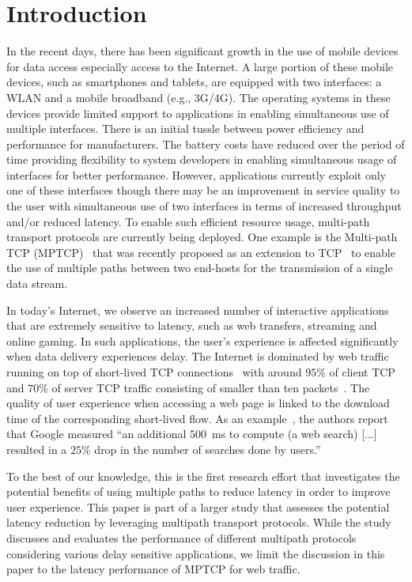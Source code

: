 \section{Introduction}
\label{sec:introduction}
In the recent days, there has been significant growth in the use of mobile devices for data access especially access to the Internet.
A large portion of these mobile devices, such as smartphones and tablets, are equipped with two interfaces: a WLAN and a mobile broadband
(e.g., 3G/4G). The operating systems in these devices provide limited support to applications in enabling simultaneous use of
multiple interfaces. There is an initial tussle between power efficiency and performance for manufacturers. The battery costs
have reduced over the period of time providing flexibility to system developers in enabling simultaneous usage of interfaces for 
better performance. However, applications currently exploit only one of these interfaces though there may be an improvement in service
quality to the user with simultaneous use of two interfaces in terms of increased throughput and/or reduced latency. 
To enable such efficient resource usage, multi-path transport protocols are currently being deployed. 
One example is the Multi-path TCP (MPTCP)~\cite{RFC6824} that was recently proposed as an extension to
TCP~\cite{RFC793} to enable the use of multiple paths between two end-hosts for the transmission of a single data stream.

In today's Internet, we observe an increased number of interactive applications that are extremely sensitive to latency, such as web transfers, 
streaming and online gaming. In such applications, the user's experience is affected significantly when data delivery experiences delay. The Internet is dominated by web traffic running on top of short-lived TCP connections~\cite{Labovitz-IOR-2009} with
around $95\%$ of client TCP and $70\%$ of server TCP traffic consisting of smaller than ten packets~\cite{Ciullo-IEEECL-2009}.
The quality of user experience when accessing a web page is linked to the download time of the corresponding short-lived flow. As an example~\cite{why-latency-matters-2013}, the authors report that Google measured ``an additional $500$~ms to compute (a web search) [$\ldots$] resulted in a
$25\%$ drop in the number of searches done by users.''

To the best of our knowledge, this is the first research effort that investigates the potential benefits of using multiple paths to reduce latency in order to 
improve user experience. This paper is part of a larger study that assesses the potential latency reduction by leveraging multipath transport protocols. 
While the study discusses and evaluates the performance of different multipath protocols considering various delay sensitive applications, we limit the 
discussion in this paper to the latency performance of MPTCP for web traffic.

